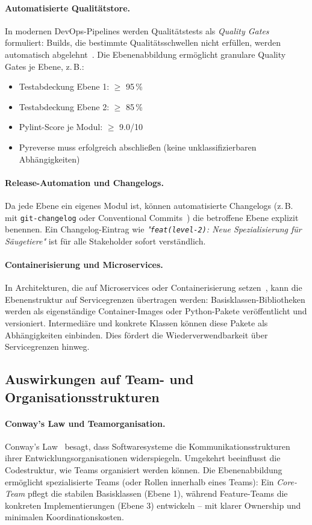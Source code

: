﻿\documentclass[a4paper,12pt]{article}
\begin{document}
\paragraph{Automatisierte Qualitätstore.}
In modernen DevOps-Pipelines werden Qualitätstests als \textit{Quality Gates}
formuliert: Builds, die bestimmte Qualitätsschwellen nicht erfüllen, werden
automatisch abgelehnt~\cite{humble2010}. Die Ebenenabbildung ermöglicht granulare
Quality Gates je Ebene, z.\,B.:
\begin{itemize}[leftmargin=*]
	\item Testabdeckung Ebene 1: $\geq$ 95\,\%
	\item Testabdeckung Ebene 2: $\geq$ 85\,\%
	\item Pylint-Score je Modul: $\geq$ 9.0/10
	\item Pyreverse muss erfolgreich abschließen (keine unklassifizierbaren Abhängigkeiten)
\end{itemize}

\paragraph{Release-Automation und Changelogs.}
Da jede Ebene ein eigenes Modul ist, können automatisierte Changelogs
(z.\,B. mit \texttt{git-changelog} oder Conventional Commits~\cite{convcommits2024})
die betroffene Ebene explizit benennen. Ein Changelog-Eintrag wie
\textit{"\texttt{feat(level-2)}: Neue Spezialisierung für Säugetiere"} ist
für alle Stakeholder sofort verständlich.

\paragraph{Containerisierung und Microservices.}
In Architekturen, die auf Microservices oder Containerisierung setzen~\cite{newman2015},
kann die Ebenenstruktur auf Servicegrenzen übertragen werden: Basisklassen-Bibliotheken
werden als eigenständige Container-Images oder Python-Pakete veröffentlicht und
versioniert. Intermediäre und konkrete Klassen können diese Pakete als Abhängigkeiten
einbinden. Dies fördert die Wiederverwendbarkeit über Servicegrenzen hinweg.

\subsection{Auswirkungen auf Team- und Organisationsstrukturen}

\paragraph{Conway's Law und Teamorganisation.}
Conway's Law~\cite{conway1968} besagt, dass Softwaresysteme die
Kommunikationsstrukturen ihrer Entwicklungsorganisationen widerspiegeln.
Umgekehrt beeinflusst die Codestruktur, wie Teams organisiert werden können.
Die Ebenenabbildung ermöglicht spezialisierte Teams (oder Rollen innerhalb
eines Teams): Ein \textit{Core-Team} pflegt die stabilen Basisklassen (Ebene 1),
während Feature-Teams die konkreten Implementierungen (Ebene 3) entwickeln --
mit klarer Ownership und minimalen Koordinationskosten.
\end{document}

